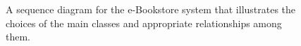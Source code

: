 \begin{figure}
  \centering
  \caption{\label{Figure::bookstoreSequence} A sequence diagram for the e-Bookstore system that illustrates the choices of the main classes and
    appropriate relationships among them.}
\end{figure}